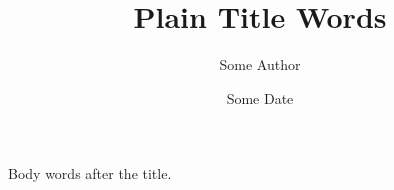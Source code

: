 \documentclass{amsart}
\title{Plain Title Words}
\author{Some Author}
\date{Some Date}
\begin{document}
\maketitle
Body words after the title.
\end{document}
